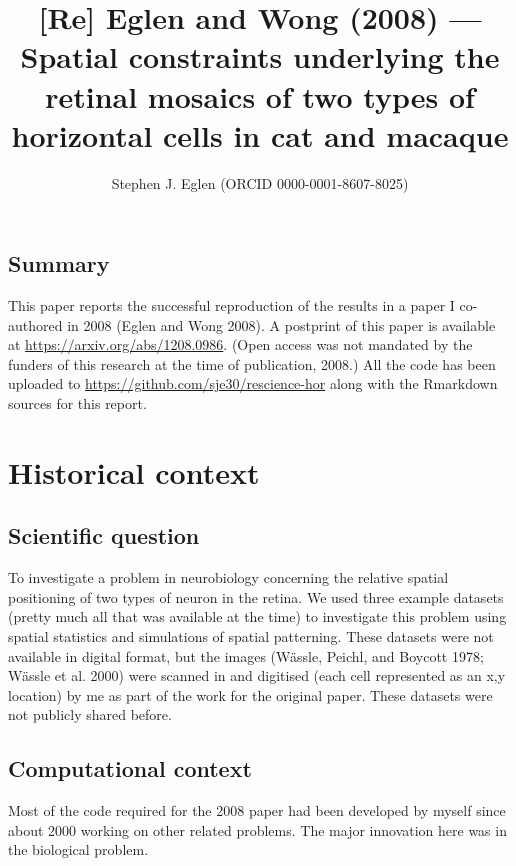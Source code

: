 \documentclass[
]{article}
\title{{[}Re{]} Eglen and Wong (2008) --- Spatial constraints underlying
the retinal mosaics of two types of horizontal cells in cat and macaque}
\author{Stephen J. Eglen (ORCID 0000-0001-8607-8025)}
\date{}
\begin{document}
\maketitle

\hypertarget{summary}{%
\subsection{Summary}\label{summary}}

This paper reports the successful reproduction of the results in a paper
I co-authored in 2008 (Eglen and Wong 2008). A postprint of this paper
is available at \url{https://arxiv.org/abs/1208.0986}. (Open access was
not mandated by the funders of this research at the time of publication,
2008.) All the code has been uploaded to
\url{https://github.com/sje30/rescience-hor} along with the Rmarkdown
sources for this report.

\hypertarget{historical-context}{%
\section{Historical context}\label{historical-context}}

\hypertarget{scientific-question}{%
\subsection{Scientific question}\label{scientific-question}}

To investigate a problem in neurobiology concerning the relative spatial
positioning of two types of neuron in the retina. We used three example
datasets (pretty much all that was available at the time) to investigate
this problem using spatial statistics and simulations of spatial
patterning. These datasets were not available in digital format, but the
images (Wässle, Peichl, and Boycott 1978; Wässle et al. 2000) were
scanned in and digitised (each cell represented as an x,y location) by
me as part of the work for the original paper. These datasets were not
publicly shared before.

\hypertarget{computational-context}{%
\subsection{Computational context}\label{computational-context}}

Most of the code required for the 2008 paper had been developed by
myself since about 2000 working on other related problems. The major
innovation here was in the biological problem.
\end{document}
